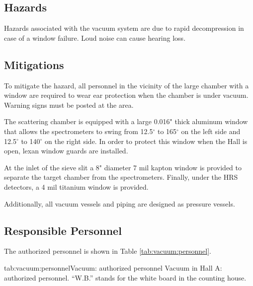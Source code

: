 \begin{safetyen}{0}{0}

\subsection{Hazards}
Hazards associated with the vacuum system are due to rapid 
decompression in case of a window failure. Loud noise can cause hearing
loss.  

\subsection{Mitigations}
To mitigate the hazard, all personnel in the vicinity of the 
large chamber with a window are required to wear ear protection when
the chamber is under vacuum. Warning signs must be posted at the area.

The scattering chamber is equipped with a large 0.016" thick aluminum window that 
allows the spectrometers to swing from 12.5$^{\circ}$ to 165$^{\circ}$ 
on the left side and 12.5$^{\circ}$ to 140$^{\circ}$ on the right side. 
In order to
protect this window when the Hall is open, lexan window guards are
installed.

At the inlet of the sieve slit a 8" diameter 7 mil kapton window 
is provided to separate the target chamber from the spectrometers.
Finally, under the HRS detectors, a 4 mil titanium window is provided.  

Additionally, all vacuum vessels and piping are designed as pressure 
vessels.
\end{safetyen}

\begin{safetyen}{0}{0}
\subsection{Responsible Personnel}
\end{safetyen}
The authorized personnel is shown in Table \ref{tab:vacuum:personnel}.
\begin{namestab}{tab:vacuum:personnel}{Vacuum: authorized personnel}{%
      Vacuum in Hall A: authorized personnel. ``W.B.'' stands for the white board 
      in the counting house.}
  \ZakRemele{}
\end{namestab}


